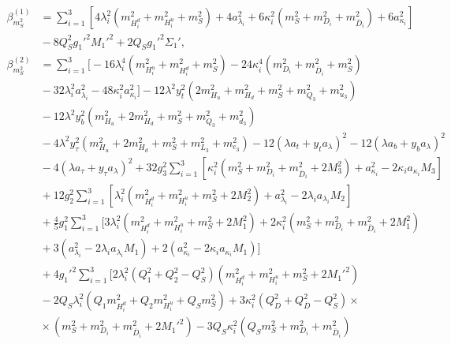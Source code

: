 \documentclass[preprint,amsmath,amssymb,aps,superscriptaddress,prd,showpacs,floatfix,nofootinbib]{revtex4-1}
\begin{document}
\begin{subequations}
\begin{align}
\beta_{m_S^2}^{(1)}&=\sum_{i=1}^3\left [ 4\lambda_i^2\left ( m_{H_i^d}^2+m_{H_i^u}^2+m_S^2\right )+4a_{\lambda_i}^2+6\kappa_i^2\left ( m_S^2+m_{D_i}^2+m_{\overline{D}_i}^2\right )+6a_{\kappa_i}^2\right ]\nonumber\\
&{}-8Q_S^2g_1'^2M_1'^2+2Q_Sg_1'^2\Sigma_1',\label{eq:USSMms2BetaOneLoop}\\
\beta_{m_S^2}^{(2)}&=\sum_{i=1}^3\bigg [ -16\lambda_i^4\left ( m_{H_i^u}^2+m_{H_i^d}^2+m_S^2 \right )-24\kappa_i^4\left ( m_{D_i}^2+m_{\overline{D}_i}^2+m_S^2 \right )\nonumber\\
&{}-32\lambda_i^2a_{\lambda_i}^2-48\kappa_i^2a_{\kappa_i}^2\bigg ]-12\lambda^2y_t^2\left ( 2m_{H_u}^2+m_{H_d}^2+m_S^2+m_{Q_3}^2+m_{u_3}^2\right )\nonumber\\
&{}-12\lambda^2y_b^2\left ( m_{H_u}^2+2m_{H_d}^2+m_S^2+m_{Q_3}^2+m_{d_3}^2\right )\nonumber\\
&{}-4\lambda^2y_\tau^2\left ( m_{H_u}^2+2m_{H_d}^2+m_S^2+m_{L_3}^2+m_{e_3}^2\right )-12\left ( \lambda a_t+y_ta_\lambda\right )^2-12\left ( \lambda a_b+y_ba_\lambda\right )^2\nonumber\\
&{}-4\left ( \lambda a_\tau+y_\tau a_\lambda\right )^2+32g_3^2\sum_{i=1}^3\left [ \kappa_i^2\left ( m_S^2+m_{D_i}^2+m_{\overline{D}_i}^2+2M_3^2\right )+a_{\kappa_i}^2-2\kappa_ia_{\kappa_i}M_3 \right ]\nonumber\\
&{}+12g_2^2\sum_{i=1}^3\left [ \lambda_i^2\left ( m_{H_i^d}^2+m_{H_i^u}^2+m_S^2+2M_2^2\right )+a_{\lambda_i}^2-2\lambda_ia_{\lambda_i}M_2\right ]\nonumber\\
&{}+\frac{4}{5}g_1^2\sum_{i=1}^3\bigg [ 3\lambda_i^2\left ( m_{H_i^d}^2+m_{H_i^u}^2+m_S^2+2M_1^2\right )+2\kappa_i^2\left ( m_S^2+m_{D_i}^2+m_{\overline{D}_i}^2+2M_1^2\right )\nonumber\\
&{}+3\left (a_{\lambda_i}^2-2\lambda_ia_{\lambda_i}M_1\right )+2\left (a_{\kappa_i}^2-2\kappa_ia_{\kappa_i}M_1\right )\bigg ]\nonumber\\
&{}+4g_1'^2\sum_{i=1}^3\bigg [ 2\lambda_i^2\left ( Q_1^2+Q_2^2-Q_S^2\right )\left ( m_{H_i^d}^2+m_{H_i^u}^2+m_S^2+2M_1'^2\right )\nonumber\\
&{}-2Q_S\lambda_i^2\left ( Q_1m_{H_i^d}^2+Q_2m_{H_i^u}^2+Q_Sm_S^2\right )+3\kappa_i^2\left ( Q_D^2+Q_{\overline{D}}^2-Q_S^2\right )\times\nonumber\\
&{}\times\left ( m_S^2+m_{D_i}^2+m_{\overline{D}_i}^2+2M_1'^2\right )-3Q_S\kappa_i^2\left ( Q_Sm_S^2+m_{D_i}^2+m_{\overline{D}_i}^2\right )\nonumber\\

\end{align}
\end{subequations}
\end{document}
